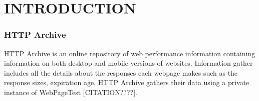 \chapter{INTRODUCTION}

\subsection{HTTP Archive}
HTTP Archive is an online repository of web performance information containing information on both desktop and mobile versions of websites. Information gather includes all the details about the responses each webpage makes such as the response sizes, expiration age, HTTP Archive gathers their data using a private instance of WebPageTest [CITATION????]. 
